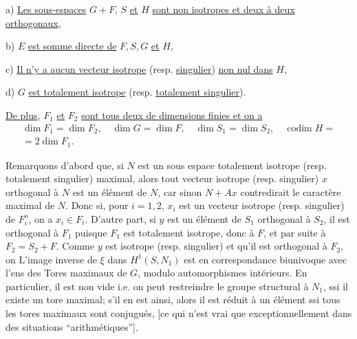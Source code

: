 a) \uline{Les sous-espaces} $G+F$, $S$ \uline{et} $H$ \uline{sont non isotropes et deux à deux orthogonaux},

b) $E$ \uline{est somme directe de} $F,S,G$ \uline{et} $H$,

c) \uline{Il n'y a aucun vecteur isotrope} (resp. \uline{singulier}) \uline{non nul dans} $H$,

d) $G$ \uline{est totalement isotrope} (resp. \uline{totalement singulier}).

\uline{De plus}, $F_1$ \uline{et} $F_2$ \uline{sont tous deux de dimensions finies et on a}
\[
\begin{gathered}\dim F_1=\dim F_2,\quad\dim G=\dim F,\quad\dim S_1=\dim S_2,\quad\operatorname{codim}H={}\\=2\dim F_1.\end{gathered}
\]

Remarquons d'abord que, si $N$ est un sous espace totalement isotrope (resp. totalement singulier) maximal, alors tout vecteur isotrope (resp. singulier) $x$ orthogonal à $N$ est un élément de $N$, car sinon $N+Ax$ contredirait le caractère maximal de $N$.
Donc si, pour $i=1,2$, $x_i$ est un vecteur isotrope (resp. singulier) de $F_i^{\mathrm o}$, on a $x_i\in F_i$. D'autre part, si $y$ est un élément de $S_1$ orthogonal à $S_2$, il est orthogonal à $F_1$ puisque $F_1$ est totalement isotrope, donc à $F$, et par suite à $F_2=S_2+F$. Comme $y$ est isotrope (resp. singulier) et qu'il est orthogonal à $F_2$, on
L'image inverse de $\xi$ dans $H^1(S,N_1)$ est en correspondance biunivoque avec l'ens des Tores maximaux de $G$, modulo automorphismes intérieurs. En particulier, il est non vide  i.e. on peut restreindre le groupe structural à $N_1$, ssi il existe un tore maximal; s'il en est ainsi, alors il est réduit à un élément ssi tous les tores maximaux sont conjugués, [ce qui n'est vrai que exceptionnellement dans des situations ``arithmétiques''].


